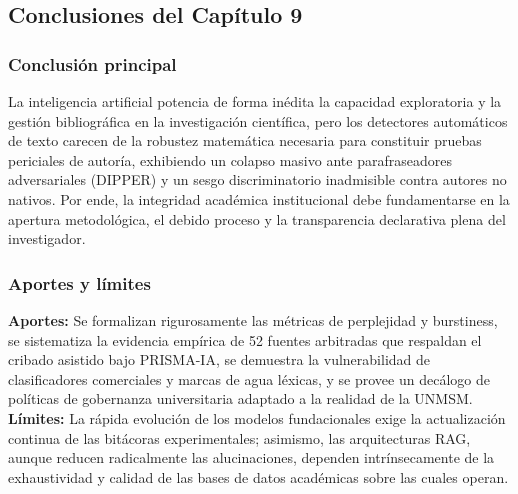 \newpage
{}
\subsection*{Conclusiones del Capítulo 9}

\subsubsection*{Conclusión principal}
La inteligencia artificial potencia de forma inédita la capacidad exploratoria y la gestión bibliográfica en la investigación científica, pero los detectores automáticos de texto carecen de la robustez matemática necesaria para constituir pruebas periciales de autoría, exhibiendo un colapso masivo ante parafraseadores adversariales (DIPPER) y un sesgo discriminatorio inadmisible contra autores no nativos. Por ende, la integridad académica institucional debe fundamentarse en la apertura metodológica, el debido proceso y la transparencia declarativa plena del investigador.

\subsubsection*{Aportes y límites}
\textbf{Aportes:} Se formalizan rigurosamente las métricas de perplejidad y burstiness, se sistematiza la evidencia empírica de 52 fuentes arbitradas que respaldan el cribado asistido bajo PRISMA-IA, se demuestra la vulnerabilidad de clasificadores comerciales y marcas de agua léxicas, y se provee un decálogo de políticas de gobernanza universitaria adaptado a la realidad de la UNMSM.\\[0.1cm]
\textbf{Límites:} La rápida evolución de los modelos fundacionales exige la actualización continua de las bitácoras experimentales; asimismo, las arquitecturas RAG, aunque reducen radicalmente las alucinaciones, dependen intrínsecamente de la exhaustividad y calidad de las bases de datos académicas sobre las cuales operan.

